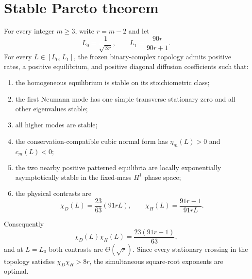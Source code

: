 \section*{Stable Pareto theorem}
For every integer $m\ge3$, write $r=m-2$ and let
\[
 L_0=\frac1{\sqrt{3r}},
 \qquad
 L_1=\frac{90r}{90r+1}.
\]
For every $L\in[L_0,L_1]$, the frozen binary-complex topology admits positive
rates, a positive equilibrium, and positive diagonal diffusion coefficients
such that:
\begin{enumerate}
\item the homogeneous equilibrium is stable on its stoichiometric class;
\item the first Neumann mode has one simple transverse stationary zero and all
other eigenvalues stable;
\item all higher modes are stable;
\item the conservation-compatible cubic normal form has $\eta_m(L)>0$ and
$c_m(L)<0$;
\item the two nearby positive patterned equilibria are locally exponentially
asymptotically stable in the fixed-mass $H^1$ phase space;
\item the physical contrasts are
\[
 \chi_D(L)=\frac{23}{63}(91rL),
 \qquad
 \chi_H(L)=\frac{91r-1}{91rL}.
\]
\end{enumerate}
Consequently
\[
 \chi_D(L)\chi_H(L)=\frac{23(91r-1)}{63},
\]
and at $L=L_0$ both contrasts are $\Theta(\sqrt r)$.  Since every stationary
crossing in the topology satisfies $\chi_D\chi_H>8r$, the simultaneous
square-root exponents are optimal.
